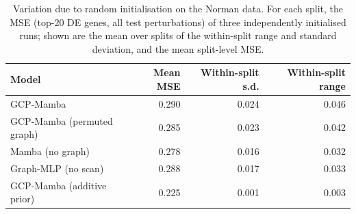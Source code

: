 \begin{table}[h]
\caption{Variation due to random initialisation on the Norman data. For each split, the MSE (top-20 DE genes, all test perturbations) of three independently initialised runs; shown are the mean over splits of the within-split range and standard deviation, and the mean split-level MSE.}\label{tab:reps}
\centering\small
\begin{tabular}{lrrr}
\toprule
Model & Mean MSE & Within-split s.d. & Within-split range \\
\midrule
GCP-Mamba & 0.290 & 0.024 & 0.046 \\
GCP-Mamba (permuted graph) & 0.285 & 0.023 & 0.042 \\
Mamba (no graph) & 0.278 & 0.016 & 0.032 \\
Graph-MLP (no scan) & 0.288 & 0.017 & 0.033 \\
GCP-Mamba (additive prior) & 0.225 & 0.001 & 0.003 \\
\bottomrule
\end{tabular}
\end{table}
